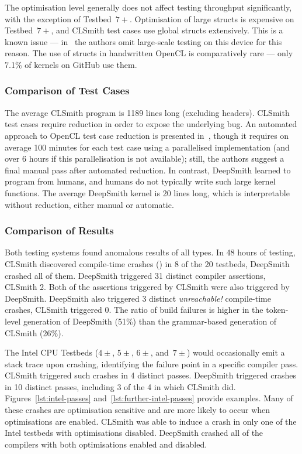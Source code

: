 The optimisation level generally does not affect testing throughput significantly, with the exception of Testbed~$7+$. Optimisation of large structs is expensive on Testbed~$7+$, and CLSmith test cases use global structs extensively. This is a known issue --- in~\cite{Lidbury2015a} the authors omit large-scale testing on this device for this reason. The use of structs in handwritten OpenCL is comparatively rare --- only 7.1\% of kernels on GitHub use them.


\subsubsection{Comparison of Test Cases}

The average CLSmith program is 1189 lines long (excluding headers). CLSmith test cases require reduction in order to expose the underlying bug. An automated approach to OpenCL test case reduction is presented in~\cite{Pflanzer2016}, though it requires on average 100 minutes for each test case using a parallelised implementation (and over 6 hours if this parallelisation is not available); still, the authors suggest a final manual pass after automated reduction. In contrast, DeepSmith learned to program from humans, and humans do not typically write such large kernel functions. The average DeepSmith kernel is 20 lines long, which is interpretable without reduction, either manual or automatic.


\subsubsection{Comparison of Results}

Both testing systems found anomalous results of all types. In 48 hours of testing, CLSmith discovered compile-time crashes (\bc) in 8 of the 20 testbeds, DeepSmith crashed all of them. DeepSmith triggered 31 distinct compiler assertions, CLSmith 2. Both of the assertions triggered by CLSmith were also triggered by DeepSmith. DeepSmith also triggered 3 distinct \emph{unreachable!} compile-time crashes, CLSmith triggered 0. The ratio of build failures is higher in the token-level generation of DeepSmith (51\%) than the grammar-based generation of CLSmith (26\%).

The Intel CPU Testbeds ($4\pm$, $5\pm$, $6\pm$, and~$7\pm$) would occasionally emit a stack trace upon crashing, identifying the failure point in a specific compiler pass. CLSmith triggered such crashes in 4 distinct passes. DeepSmith triggered crashes in 10 distinct passes, including 3 of the 4 in which CLSmith did. Figures~\ref{lst:intel-passes} and~\ref{lst:further-intel-passes} provide examples. Many of these crashes are optimisation sensitive and are more likely to occur when optimisations are enabled. CLSmith was able to induce a crash in only one of the Intel testbeds with optimisations disabled. DeepSmith crashed all of the compilers with both optimisations enabled and disabled.


